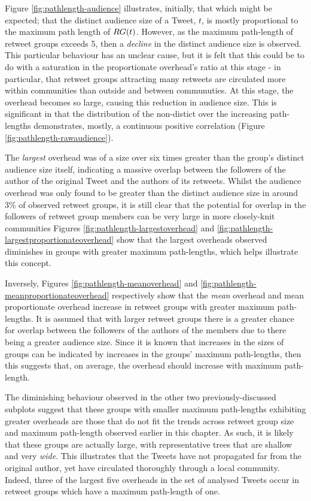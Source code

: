 Figure \ref{fig:pathlength-audience} illustrates, initially, that which might be expected; that the distinct audience size of a Tweet, $t$, is mostly proportional to the maximum path length of $RG(t)$. However, as the maximum path-length of retweet groups exceeds 5, then a \textit{decline} in the distinct audience size is observed. This particular behaviour has an unclear cause, but it is felt that this could be to do with a saturation in the proportionate overhead's ratio at this stage - in particular, that retweet groups attracting many retweets are circulated more within communities than outside and between communuties. At this stage, the overhead becomes so large, causing this reduction in audience size. This is significant in that the distribution of the non-distict over the increasing path-lengths demonstrates, mostly, a continuous positive correlation (Figure \ref{fig:pathlength-rawaudience}).

 

The \textit{largest} overhead was of a size over six times greater than the group's distinct audience size itself, indicating a massive overlap between the followers of the author of the original Tweet and the authors of its retweets. Whilst the audience overhead was only found to be greater than the distinct audience size in around 3\% of observed retweet groups, it is still clear that the potential for overlap in the followers of retweet group members can be very large in more closely-knit communities Figures \ref{fig:pathlength-largestoverhead} and \ref{fig:pathlength-largestproportionateoverhead} show that the largest overheads observed diminishes in groups with greater maximum path-lengths, which helps illustrate this concept.

Inversely, Figures \ref{fig:pathlength-meanoverhead} and \ref{fig:pathlength-meanproportionateoverhead} respectively show that the \textit{mean} overhead and mean proportionate overhead increase in retweet groups with greater maximum path-lengths. It is assumed that with larger retweet groups there is a greater chance for overlap between the followers of the authors of the members due to there being a greater audience size. Since it is known that increases in the sizes of groups can be indicated by increases in the groups' maximum path-lengths, then this suggests that, on average, the overhead should increase with maximum path-length. 

The diminishing behaviour observed in the other two previously-discussed subplots suggest that these groups with smaller maximum path-lengths exhibiting greater overheads are those that do not fit the trends across retweet group size and maximum path-length observed earlier in this chapter. As such, it is likely that these groups are actually large, with representative trees that are shallow and very \textit{wide}. This illustrates that the Tweets have not propagated far from the original author, yet have circulated thoroughly through a local community. Indeed, three of the largest five overheads in the set of analysed Tweets occur in retweet groups which have a maximum path-length of one. 


